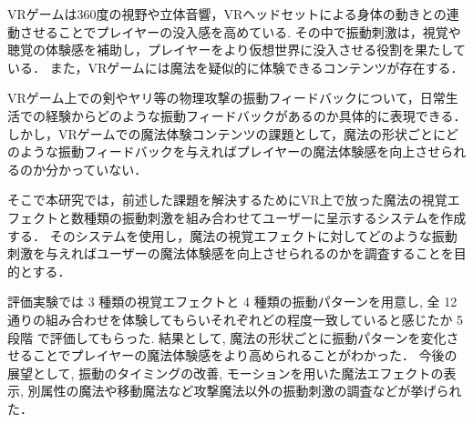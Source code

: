 VRゲームは360度の視野や立体音響，VRヘッドセットによる身体の動きとの連動させることでプレイヤーの没入感を高めている.
その中で振動刺激は，視覚や聴覚の体験感を補助し，プレイヤーをより仮想世界に没入させる役割を果たしている．
また，VRゲームには魔法を疑似的に体験できるコンテンツが存在する．

VRゲーム上での剣やヤリ等の物理攻撃の振動フィードバックについて，日常生活での経験からどのような振動フィードバックがあるのか具体的に表現できる．
しかし，VRゲームでの魔法体験コンテンツの課題として，魔法の形状ごとにどのような振動フィードバックを与えればプレイヤーの魔法体験感を向上させられるのか分かっていない．

そこで本研究では，前述した課題を解決するためにVR上で放った魔法の視覚エフェクトと数種類の振動刺激を組み合わせてユーザーに呈示するシステムを作成する．
そのシステムを使用し，魔法の視覚エフェクトに対してどのような振動刺激を与えればユーザーの魔法体験感を向上させられるのかを調査することを目的とする．

評価実験では 3 種類の視覚エフェクトと 4 種類の振動パターンを用意し, 全 12 通りの組み合わせを体験してもらいそれぞれどの程度一致していると感じたか 5 段階
で評価してもらった. 
結果として, 魔法の形状ごとに振動パターンを変化させることでプレイヤーの魔法体験感をより高められることがわかった．
今後の展望として, 振動のタイミングの改善, モーションを用いた魔法エフェクトの表示, 別属性の魔法や移動魔法など攻撃魔法以外の振動刺激の調査などが挙げられた．

